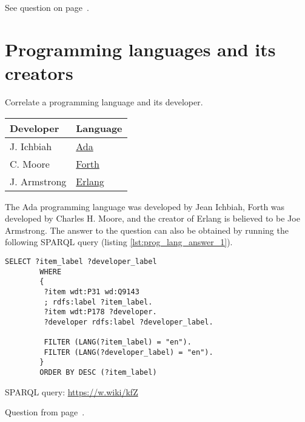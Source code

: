 See question on page~\pageref{question:administrative_territorial}.

\section{Programming languages and its creators}
\begin{exercise}
    \label{answer:prog_lang_1}
Correlate a programming language and its developer.
	\begin{tabular}{ll}
		Developer & Language\\
		\hline
		J. Ichbiah & \href{https://www.wikidata.org/wiki/Q154755}{Ada}\\
		C. Moore & \href{https://www.wikidata.org/wiki/Q275472}{Forth}\\
		J. Armstrong & \href{https://www.wikidata.org/wiki/Q334879}{Erlang}\\
	\end{tabular}
\end{exercise}
    The Ada programming language was developed by Jean Ichbiah, Forth was developed by Charles H. Moore, and the creator of Erlang is believed to be Joe Armstrong. The answer to the question can also be obtained by running the following SPARQL query (listing \ref{lst:prog_lang_answer_1}). 
	\begin{lstlisting}[language=SPARQL, caption={{Programming languages developers}\protect\footnotemark}, label=lst:prog_lang_answer_1]
		SELECT ?item_label ?developer_label
		WHERE
		{
		 ?item wdt:P31 wd:Q9143
		 ; rdfs:label ?item_label. 
		 ?item wdt:P178 ?developer.
		 ?developer rdfs:label ?developer_label.
		 
		 FILTER (LANG(?item_label) = "en"). 
		 FILTER (LANG(?developer_label) = "en"). 
		}
		ORDER BY DESC (?item_label)
	\end{lstlisting}
SPARQL query: \href{https://w.wiki/kfZ}{https://w.wiki/kfZ}

Question from page~\pageref{question:prog_lang_1}.


